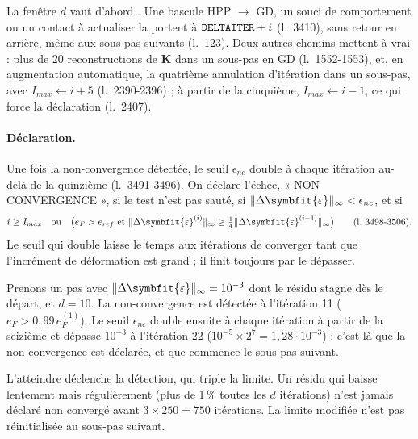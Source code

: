 \documentclass[11pt,a4paper]{article}
\numberwithin{equation}{section}
\newcommand{\src}[1]{\texttt{\detokenize{#1}}}          %
\newcommand{\lig}[1]{l.~#1}
\newcommand{\vc}[1]{\symbf{#1}}                         %
\newcommand{\Deps}{\Delta\symbfit{\varepsilon}}
\newcommand{\norminf}[1]{\lVert #1\rVert_{\infty}}
\begin{document}
La fenêtre $d$ vaut d'abord \src{DELTAITER}.
Une bascule HPP $\to$ GD, un souci de comportement ou un contact à actualiser la portent à $\src{DELTAITER} + i$ (\lig{3410}), sans retour en arrière, même aux sous-pas suivants (\lig{123}).
Deux autres chemins mettent \src{NONCONV} à vrai : plus de 20 reconstructions de $\vc K$ dans un sous-pas en GD (\lig{1552-1553}), et, en augmentation automatique, la quatrième annulation d'itération dans un sous-pas, avec $I_{max} \gets i + 5$ (\lig{2390-2396}) ; à partir de la cinquième, $I_{max} \gets i - 1$, ce qui force la déclaration (\lig{2407}).

\paragraph{Déclaration.}
Une fois la non-convergence détectée, le seuil $\epsilon_{nc}$ double à chaque itération au-delà de la quinzième (\lig{3491-3496}).
On déclare l'échec, « NON CONVERGENCE », si le test n'est pas sauté, si $\norminf{\Deps} < \epsilon_{nc}$, et si
\begin{equation}
i \ge I_{max}\quad\text{ou}\quad\big(e_F > e_{ref}\ \text{et}\ \norminf{\Deps^{(i)}} \ge \tfrac14\norminf{\Deps^{(i-1)}}\big)
\qquad(\text{\lig{3498-3506}}).
\end{equation}
Le seuil qui double laisse le temps aux itérations de converger tant que l'incrément de déformation est grand ; il finit toujours par le dépasser.

\begin{remarque}[Exemple]
Prenons un pas avec $\norminf{\Deps} = 10^{-3}$ dont le résidu stagne dès le départ, et $d = 10$.
La non-convergence est détectée à l'itération 11 ($e_F > 0{,}99\,e_F^{(1)}$).
Le seuil $\epsilon_{nc}$ double ensuite à chaque itération à partir de la seizième et dépasse $10^{-3}$ à l'itération 22 ($10^{-5}\times 2^{7} = 1{,}28\cdot10^{-3}$) : c'est là que la non-convergence est déclarée, et que commence le sous-pas suivant.
\end{remarque}

\begin{remarque}
L'atteindre déclenche la détection, qui triple la limite.
Un résidu qui baisse lentement mais régulièrement (plus de 1\,\% toutes les $d$ itérations) n'est jamais déclaré non convergé avant $3 \times 250 = 750$ itérations.
La limite modifiée n'est pas réinitialisée au sous-pas suivant.
\end{remarque}
\end{document}
